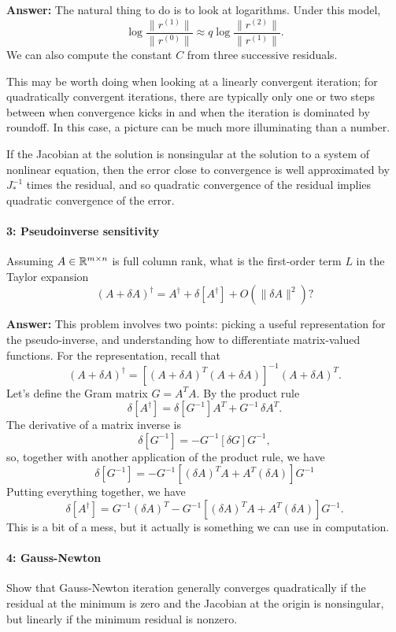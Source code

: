 \documentclass[12pt, leqno]{article}
\begin{document}
{\bf Answer:}
The natural thing to do is to look at logarithms.  Under this model,
\[
  \log \frac{\|r^{(1)}\|}{\|r^{(0)}\|} \approx q
  \log \frac{\|r^{(2)}\|}{\|r^{(1)}\|}.
\]
We can also compute the constant $C$ from three successive residuals.

This may be worth doing when looking at a linearly convergent
iteration; for quadratically convergent iterations, there are
typically only one or two steps between when convergence kicks in
and when the iteration is dominated by roundoff.  In this case,
a picture can be much more illuminating than a number.

If the Jacobian at the solution is nonsingular at the solution
to a system of nonlinear equation, then the error close to
convergence is well approximated by $J_*^{-1}$ times the residual,
and so quadratic convergence of the residual implies quadratic
convergence of the error.

\paragraph*{3: Pseudoinverse sensitivity}
Assuming $A \in \mathbb{R}^{m \times n}$ is full column rank,
what is the first-order term $L$ in the Taylor expansion
\[
(A+\delta A)^\dagger = A^\dagger + \delta \left[ A^\dagger \right] +
                      O(\|\delta A\|^2)?
\]

{\bf Answer:}
This problem involves two points: picking a useful representation
for the pseudo-inverse, and understanding how to differentiate
matrix-valued functions.  For the representation, recall that
\[
  (A+\delta A)^\dagger =
  \left[ (A+\delta A)^T(A+\delta A) \right]^{-1} (A+\delta A)^T.
\]
Let's define the Gram matrix $G = A^T A$.  By the product rule
\[
  \delta \left[ A^\dagger \right] =
    \delta \left[ G^{-1} \right] A^T + G^{-1} \, \delta A^T.
\]
The derivative of a matrix inverse is
\[
  \delta [G^{-1}] = -G^{-1} [\delta G] G^{-1},
\]
so, together with another application of the product rule, we have
\[
  \delta \left[ G^{-1} \right] =
    -G^{-1} [(\delta A)^T A + A^T (\delta A)] G^{-1}
\]
Putting everything together, we have
\[
  \delta [A^\dagger] =
    G^{-1} (\delta A)^T -
    G^{-1} \left[ (\delta A)^T A + A^T (\delta A) \right] G^{-1}.
\]
This is a bit of a mess, but it actually is something we can use in
computation.

\paragraph*{4: Gauss-Newton}
Show that Gauss-Newton iteration generally converges quadratically if the
residual at the minimum is zero and the Jacobian at the origin is
nonsingular, but linearly if the minimum residual is nonzero.
\end{document}
